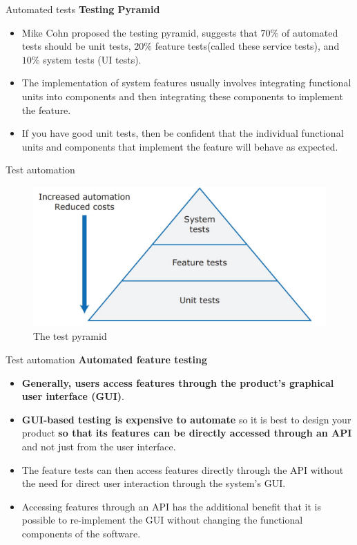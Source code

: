 \documentclass{beamer}
\begin{document}
\begin{frame}{Automated tests}
\textbf{Testing Pyramid}
\begin{itemize}
	\item Mike Cohn  proposed the testing pyramid, suggests that $70\%$ of automated tests should be unit tests, $20\%$ feature tests(called these service tests), and $10\%$ system tests (UI tests).
	\item The implementation of system features usually involves integrating functional units into components and then integrating these components to implement the feature.
	\item If you have good unit tests, then be confident that the individual functional units and components that implement the feature will behave as expected. 
\end{itemize}
\end{frame}
\begin{frame}{Test automation}
	\begin{figure}
		\includegraphics[scale=.4]{img/m3_29}
		\caption{The test pyramid}
	\end{figure}
\end{frame}
\begin{frame}{Test automation}
	\textbf{Automated feature testing}
	\begin{itemize}
		\item \textbf{Generally, users access features through the product’s graphical user interface (GUI)}. 
		\item \textbf{GUI-based testing is expensive to automate} so it is best to design your product \textbf{so that its features can be directly accessed through an API }and not just from the user interface. 
		\item The feature tests can then access features directly through the API without the need for direct user interaction through the system’s GUI. 
		\item Accessing features through an API has the additional benefit that it is possible to re-implement the GUI without changing the functional components of the software.
		
	\end{itemize}
\end{frame}
\end{document}
